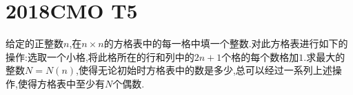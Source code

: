 \documentclass[]{article}
\title{}
\author{}
\date{}
\begin{document}
\maketitle
\section{2018CMO T5}{
给定的正整数$n$,在$n\times n$的方格表中的每一格中填一个整数.对此方格表进行如下的操作:选取一个小格,将此格所在的行和列中的$2n+1$个格的每个数格加$1$.求最大的整数$N=N(n)$,使得无论初始时方格表中的数是多少,总可以经过一系列上述操作,使得方格表中至少有$N$个偶数.
}
\end{document}
